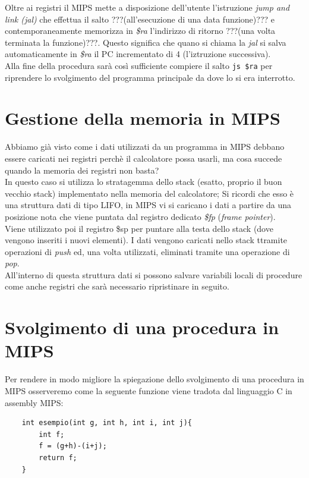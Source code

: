 \documentclass[class=book, crop=false]{standalone}
\begin{document}
Oltre ai registri il MIPS mette a disposizione dell'utente l'istruzione \emph{jump and link (jal)} che effettua il salto ???(all'esecuzione di una data funzione)??? e contemporaneamente memorizza in \emph{\$ra} l'indirizzo di ritorno ???(una volta terminata la funzione)???. Questo significa che quano si chiama la \emph{jal} si salva automaticamente in \emph{\$ra} il PC incrementato di 4 (l'iztruzione successiva).\\
Alla fine della procedura sarà così sufficiente compiere il salto \texttt{js \$ra} per riprendere lo svolgimento del programma principale da dove lo si era interrotto.

\section{Gestione della memoria in MIPS}
Abbiamo già visto come i dati utilizzati da un programma in MIPS debbano essere caricati nei registri perchè il calcolatore possa usarli, ma cosa succede quando la memoria dei registri non basta?\\
In questo caso si utilizza lo stratagemma dello stack (esatto, proprio il buon vecchio stack) implementato nella memoria del calcolatore; Si ricordi che esso è una struttura dati di tipo LIFO, in MIPS vi si caricano i dati a partire da una posizione nota che viene puntata dal registro dedicato \emph{\$fp} (\emph{frame pointer}).\\
Viene utilizzato poi il registro \$sp per puntare alla testa dello stack (dove vengono inseriti i nuovi elementi).
I dati vengono caricati nello stack ttramite operazioni di \emph{push} ed, una volta utilizzati, eliminati tramite una operazione di \emph{pop}.\\
All'interno di questa struttura dati si possono salvare variabili locali di procedure come anche registri che sarà necessario ripristinare in seguito.\\

\section{Svolgimento di una procedura in MIPS}
Per rendere in modo migliore la spiegazione dello svolgimento di una procedura in MIPS osserveremo come la seguente funzione viene tradota dal linguaggio C in assembly MIPS:

\begin{verbatim}
	int esempio(int g, int h, int i, int j){
		int f;
		f = (g+h)-(i+j);
		return f;
	}
\end{verbatim}
\end{document}

